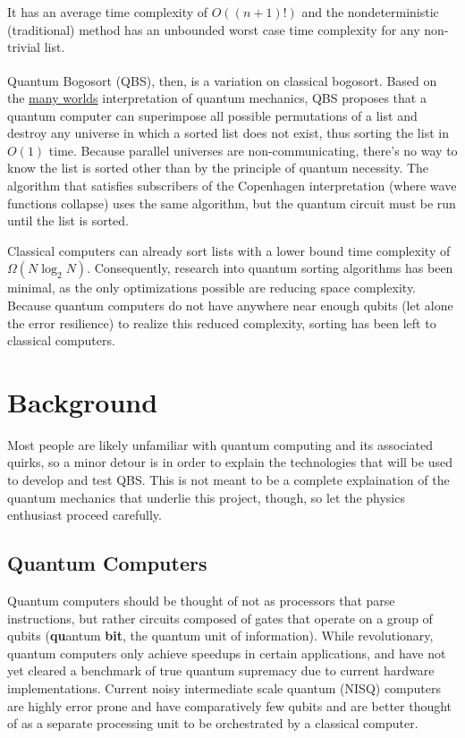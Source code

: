 \documentclass[12pt]{article}
\begin{document}
\noindent It has an average time complexity of $O((n+1)!)$ and the nondeterministic (traditional) method has an unbounded worst case time complexity for any non-trivial list.

Quantum Bogosort\textsuperscript{\cite{the_other_tree_2009}} (QBS), then, is a variation on classical bogosort. Based on the \href{https://www.pbs.org/wgbh/nova/manyworlds/pdf/dissertation.pdf}{many worlds} interpretation of quantum mechanics, QBS proposes that a quantum computer can superimpose all possible permutations of a list and destroy any universe in which a sorted list does not exist, thus sorting the list in $ O(1) $ time. Because parallel universes are non-communicating, there's no way to know the list is sorted other than by the principle of quantum necessity. The algorithm that satisfies subscribers of the Copenhagen interpretation (where wave functions collapse) uses the same algorithm, but the quantum circuit must be run until the list is sorted.

Classical computers can already sort lists with a lower bound time complexity of $\Omega (N \log_2 N)$. Consequently, research into quantum sorting algorithms has been minimal, as the only optimizations possible are reducing space complexity. Because quantum computers do not have anywhere near enough qubits (let alone the error resilience) to realize this reduced complexity, sorting has been left to classical computers.

\section{Background}
Most people are likely unfamiliar with quantum computing and its associated quirks, so a minor detour is in order to explain the technologies that will be used to develop and test QBS. This is not meant to be a complete explaination of the quantum mechanics that underlie this project, though, so let the physics enthusiast proceed carefully.

\subsection{Quantum Computers}
Quantum computers should be thought of not as processors that parse instructions, but rather circuits composed of gates that operate on a group of qubits (\textbf{qu}antum \textbf{bit}, the quantum unit of information). While revolutionary, quantum computers only achieve speedups in certain applications, and have not yet cleared a benchmark of true quantum supremacy due to current hardware implementations. Current noisy intermediate scale quantum (NISQ) computers are highly error prone and have comparatively few qubits and are better thought of as a separate processing unit to be orchestrated by a classical computer.
\end{document}
